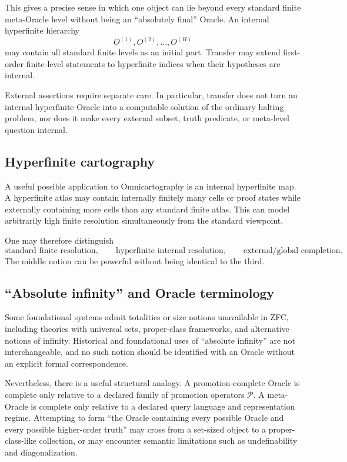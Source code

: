 \documentclass[11pt]{article}
\begin{document}
This gives a precise sense in which one object can lie beyond every standard finite meta-Oracle level without being an ``absolutely final'' Oracle. An internal hyperfinite hierarchy
\[
O^{(1)},O^{(2)},\ldots,O^{(H)}
\]
may contain all standard finite levels as an initial part. Transfer may extend first-order finite-level statements to hyperfinite indices when their hypotheses are internal.

External assertions require separate care. In particular, transfer does not turn an internal hyperfinite Oracle into a computable solution of the ordinary halting problem, nor does it make every external subset, truth predicate, or meta-level question internal.

\subsection{Hyperfinite cartography}
A useful possible application to Omnicartography is an internal hyperfinite map. A hyperfinite atlas may contain internally finitely many cells or proof states while externally containing more cells than any standard finite atlas. This can model arbitrarily high finite resolution simultaneously from the standard viewpoint.

One may therefore distinguish
\[
\text{standard finite resolution},\qquad
\text{hyperfinite internal resolution},\qquad
\text{external/global completion}.
\]
The middle notion can be powerful without being identical to the third.

\subsection{``Absolute infinity'' and Oracle terminology}
Some foundational systems admit totalities or size notions unavailable in ZFC, including theories with universal sets, proper-class frameworks, and alternative notions of infinity. Historical and foundational uses of ``absolute infinity'' are not interchangeable, and no such notion should be identified with an Oracle without an explicit formal correspondence.

Nevertheless, there is a useful structural analogy. A promotion-complete Oracle is complete only relative to a declared family of promotion operators $\mathcal P$. A meta-Oracle is complete only relative to a declared query language and representation regime. Attempting to form ``the Oracle containing every possible Oracle and every possible higher-order truth'' may cross from a set-sized object to a proper-class-like collection, or may encounter semantic limitations such as undefinability and diagonalization.
\end{document}
